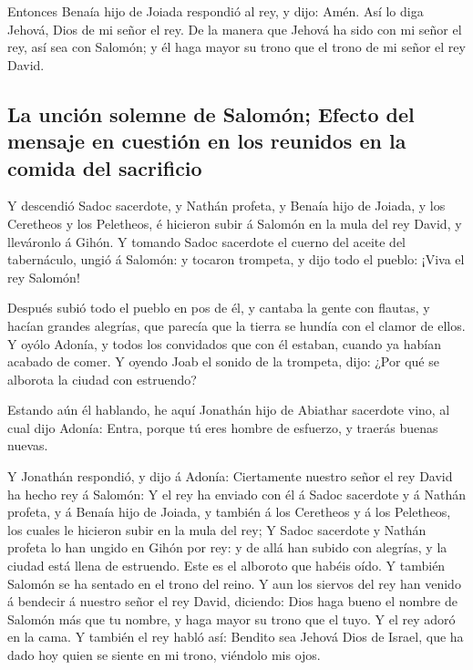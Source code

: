  Entonces Benaía hijo de Joiada respondió al rey, y dijo:
Amén. Así lo diga Jehová, Dios de mi señor el rey.  De la
manera que Jehová ha sido con mi señor el rey, así sea con Salomón; y él
haga mayor su trono que el trono de mi señor el rey David.

\hypertarget{la-unciuxf3n-solemne-de-salomuxf3n-efecto-del-mensaje-en-cuestiuxf3n-en-los-reunidos-en-la-comida-del-sacrificio}{%
\subsection{La unción solemne de Salomón; Efecto del mensaje en cuestión
en los reunidos en la comida del
sacrificio}\label{la-unciuxf3n-solemne-de-salomuxf3n-efecto-del-mensaje-en-cuestiuxf3n-en-los-reunidos-en-la-comida-del-sacrificio}}

 Y descendió Sadoc sacerdote, y Nathán profeta, y Benaía
hijo de Joiada, y los Ceretheos y los Peletheos, é hicieron subir á
Salomón en la mula del rey David, y lleváronlo á Gihón.  Y
tomando Sadoc sacerdote el cuerno del aceite del tabernáculo, ungió á
Salomón: y tocaron trompeta, y dijo todo el pueblo: ¡Viva el rey
Salomón!

 Después subió todo el pueblo en pos de él, y cantaba la
gente con flautas, y hacían grandes alegrías, que parecía que la tierra
se hundía con el clamor de ellos.  Y oyólo Adonía, y todos
los convidados que con él estaban, cuando ya habían acabado de comer. Y
oyendo Joab el sonido de la trompeta, dijo: ¿Por qué se alborota la
ciudad con estruendo?

 Estando aún él hablando, he aquí Jonathán hijo de Abiathar
sacerdote vino, al cual dijo Adonía: Entra, porque tú eres hombre de
esfuerzo, y traerás buenas nuevas.

 Y Jonathán respondió, y dijo á Adonía: Ciertamente nuestro
señor el rey David ha hecho rey á Salomón:  Y el rey ha
enviado con él á Sadoc sacerdote y á Nathán profeta, y á Benaía hijo de
Joiada, y también á los Ceretheos y á los Peletheos, los cuales le
hicieron subir en la mula del rey;  Y Sadoc sacerdote y
Nathán profeta lo han ungido en Gihón por rey: y de allá han subido con
alegrías, y la ciudad está llena de estruendo. Este es el alboroto que
habéis oído.  Y también Salomón se ha sentado en el trono
del reino.  Y aun los siervos del rey han venido á bendecir
á nuestro señor el rey David, diciendo: Dios haga bueno el nombre de
Salomón más que tu nombre, y haga mayor su trono que el tuyo. Y el rey
adoró en la cama.  Y también el rey habló así: Bendito sea
Jehová Dios de Israel, que ha dado hoy quien se siente en mi trono,
viéndolo mis ojos.

